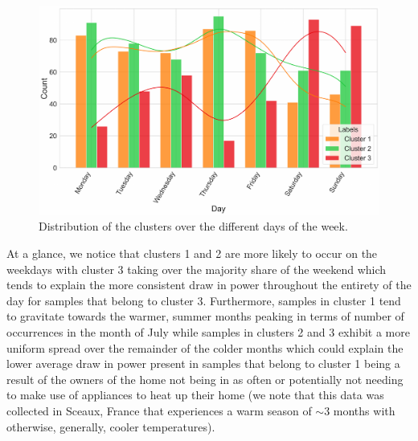 \begin{adjustwidth}{-1.65cm}{-0.0cm}
\begin{enumerate}[label=Step 2.\arabic*:, leftmargin=*]
        \begin{figure}[H]
            \centering
            \includegraphics[width=\textwidth]{Images/Chapter 5/Stage 2/UCID/UCID-HDBSCAN-4.pdf}
            \caption{Distribution of the clusters over the different days of the week.}
            \label{fig:UCID-HDBSCAN-4}
        \end{figure}
        
        \noindent \newline At a glance, we notice that clusters 1 and 2 are more likely to occur on the weekdays with cluster 3 taking over the majority share of the weekend which tends to explain the more consistent draw in power throughout the entirety of the day for samples that belong to cluster 3. Furthermore, samples in cluster 1 tend to gravitate towards the warmer, summer months peaking in terms of number of occurrences in the month of July while samples in clusters 2 and 3 exhibit a more uniform spread over the remainder of the colder months which could explain the lower average draw in power present in samples that belong to cluster 1 being a result of the owners of the home not being in as often or potentially not needing to make use of appliances to heat up their home (we note that this data was collected in Sceaux, France that experiences a warm season of $\sim \! 3$  months with otherwise, generally, cooler temperatures). 
        

\end{enumerate}
\end{adjustwidth}
